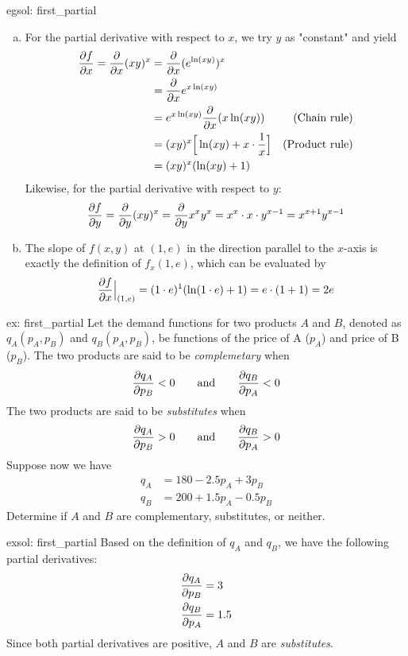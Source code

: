 \begin{egsol}[]{egsol: first_partial}
    \begin{enumerate}[a)]
        \item For the partial derivative with respect to $x$, we try $y$ as "constant" and yield
        \begin{align*}
            \frac{\partial f}{\partial x} = \frac{\partial}{\partial x} (xy)^x&= \frac{\partial}{\partial x} (e^{\ln(xy)})^x &\\
            &= \frac{\partial}{\partial x} e^{x \ln(xy)}&\\
            &= e^{x \ln(xy)} \frac{\partial}{\partial x} (x \ln (xy))&\text{(Chain rule)}\\
            &= (xy)^x \Big[\ln(xy) + x \cdot \frac{1}{x}\Big]&\text{(Product rule)}\\
            &= (xy)^x(\ln(xy)+1)& 
        \end{align*}
        Likewise, for the partial derivative with respect to $y$:
        \[\frac{\partial f}{\partial y} = \frac{\partial}{\partial y}(xy)^x = \frac{\partial}{\partial y} x^x y^x = x^x \cdot x \cdot y^{x-1} = x^{x+1}y^{x-1}\]
        \item The slope of $f(x,y)$ at $(1,e)$ in the direction parallel to the $x$-axis is exactly the definition of $f_x(1,e)$, which can be evaluated by
        \[\frac{\partial f}{\partial x}\Big|_{(1,e)} = (1 \cdot e)^1 (\ln(1 \cdot e) + 1) = e \cdot (1+1) = 2e\]
    \end{enumerate}
\end{egsol}

\begin{ex}[]{ex: first_partial}
    Let the demand functions for two products $A$ and $B$, denoted as $q_A(p_A, p_B)$ and $q_B(p_A, p_B)$, be functions of the price of A ($p_A$) and price of B ($p_B$).  The two products are said to be \textit{complemetary} when 
    \[\frac{\partial q_A}{\partial p_B} < 0 \qquad \text{and} \qquad \frac{\partial q_B}{\partial p_A} < 0\]
    The two products are said to be \textit{substitutes} when 
    \[\frac{\partial q_A}{\partial p_B} > 0 \qquad \text{and} \qquad \frac{\partial q_B}{\partial p_A} > 0\]
    Suppose now we have 
    \begin{align*}
        q_A &= 180 - 2.5 p_A + 3 p_B\\
        q_B &= 200 + 1.5 p_A - 0.5 p_B 
    \end{align*}
    Determine if $A$ and $B$ are complementary, substitutes, or neither.
\end{ex}

\begin{exsol}[]{exsol: first_partial}
    Based on the definition of $q_A$ and $q_B$, we have the following partial derivatives:
    \begin{align*}
        \frac{\partial q_A}{\partial p_B} &= 3\\
        \frac{\partial q_B}{\partial p_A} &= 1.5
    \end{align*}
    Since both partial derivatives are positive, $A$ and $B$ are \textit{substitutes}. 
\end{exsol}

